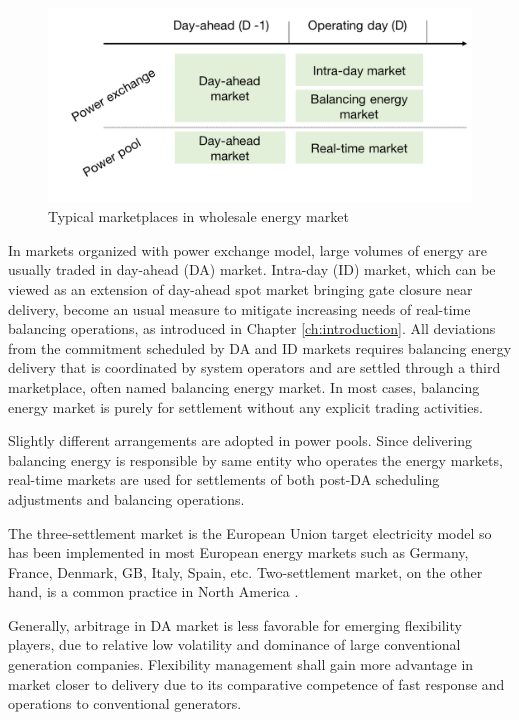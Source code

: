 \begin{figure}[h!]
	\centering
	\includegraphics[width=0.95\linewidth]{Figures/EnergyMarketplaces}
	\caption{Typical marketplaces in wholesale energy market}
	\label{fig:energy-marketplaces}
\end{figure}

In markets organized with power exchange model, large volumes of energy are usually traded in day-ahead (DA) market. Intra-day (ID) market, which can be viewed as an extension of day-ahead spot market bringing gate closure near delivery, become an usual measure to mitigate increasing needs of real-time balancing operations, as introduced in Chapter \ref{ch:introduction}. All deviations from the commitment scheduled by DA and ID markets requires balancing energy delivery that is coordinated by system operators and are settled through a third marketplace, often named balancing energy market. In most cases, balancing energy market is purely for settlement without any explicit trading activities.

Slightly different arrangements are adopted in power pools. Since delivering balancing energy is responsible by same entity who operates the energy markets, real-time markets are used for settlements of both post-DA scheduling adjustments and balancing operations.

The three-settlement market is the European Union target electricity model \cite{EuropeanCommission2016} so has been implemented in most European energy markets such as Germany, France, Denmark, GB, Italy, Spain, etc.  Two-settlement market, on the other hand, is a common practice in North America  \cite{Cochran2013}.

Generally, arbitrage in DA market is less favorable for emerging flexibility players, due to relative low volatility and dominance of large conventional generation companies. Flexibility management shall gain more advantage in market closer to delivery due to its comparative competence of fast response and operations to conventional generators. 

